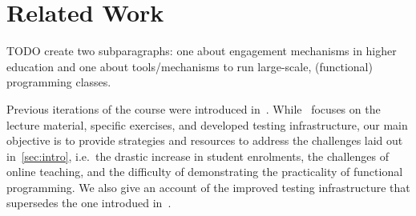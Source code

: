 \section{Related Work}\label{sec:related_work}

TODO create two subparagraphs:
one about engagement mechanisms in higher education and
one about tools/mechanisms to run large-scale, (functional)
programming classes.

Previous iterations of the course were introduced in~\cite{next_1100}.
While~\cite{next_1100} focuses on the lecture material,
specific exercises, and developed testing infrastructure,
our main objective is to provide strategies and resources to address
the challenges laid out in~\cref{sec:intro},
i.e.\ the drastic increase in student enrolments,
the challenges of online teaching,
and the difficulty of demonstrating the practicality of functional programming.
We also give an account of the improved testing infrastructure
that supersedes the one introdued in~\cite{next_1100}.
